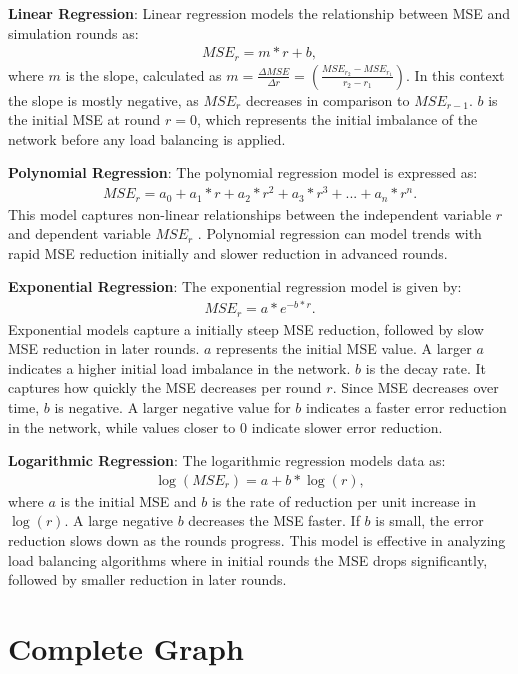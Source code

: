 \textbf{Linear Regression}: Linear regression models the relationship between MSE and simulation rounds as: 
\begin{align} \label{eq:linreg}
    MSE_r=m*r+b,    
\end{align}
where $m$ is the slope, calculated as $m=\frac{\Delta MSE}{\Delta r}=(\frac{MSE_{r_2}-MSE_{r_1}}{r_2 - r_1})$. In this context the slope is mostly negative, as $MSE_r$ decreases in comparison to $MSE_{r-1}$. $b$ is the initial MSE at round $r=0$, which represents the initial imbalance of the network before any load balancing is applied.

\textbf{Polynomial Regression}: The polynomial regression model is expressed as:
\begin{align} \label{eq:polyfit}
    MSE_r=a_0+a_1*r+a_2*r^{2}+a_3*r^{3}+...+a_n*r^{n}.    
\end{align}
This model captures non-linear relationships between the independent variable $r$ and dependent variable $MSE_r$ \cite{MotulskyDataFitting}. Polynomial regression can model trends with rapid MSE reduction initially and slower reduction in advanced rounds.

\textbf{Exponential Regression}: The exponential regression model is given by: 
\begin{align}
    MSE_r=a*e^{-b*r}.    
\end{align}
Exponential models capture a initially steep MSE reduction, followed by slow MSE reduction in later rounds. $a$ represents the initial MSE value. A larger $a$ indicates a higher initial load imbalance in the network. $b$ is the decay rate. It captures how quickly the MSE decreases per round $r$. Since MSE decreases over time, $b$ is negative. A larger negative value for $b$ indicates a faster error reduction in the network, while values closer to 0 indicate slower error reduction.

\textbf{Logarithmic Regression}: The logarithmic regression models data as:
\begin{align}
    \log{(MSE_r)}=a+b*\log{(r)},    
\end{align}
where $a$ is the initial MSE and $b$ is the rate of reduction per unit increase in $\log{(r)}$. A large negative $b$ decreases the MSE faster. If $b$ is small, the error reduction slows down as the rounds progress. This model is effective in analyzing load balancing algorithms where in initial rounds the MSE drops significantly, followed by smaller reduction in later rounds.

\section{Complete Graph}\label{sec:completeGraph}

